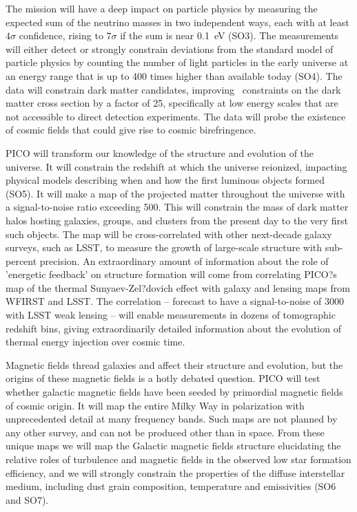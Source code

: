 \documentclass[PICOReport.tex]{subfiles}
\begin{document}
The mission will have a deep impact on particle physics by measuring the expected sum of the neutrino masses in two independent ways, each with at least $4\sigma$ confidence, rising to $7\sigma$ if the sum is near 0.1~eV (SO3). The measurements will either detect or strongly constrain deviations from the standard model of particle physics by counting the number of light particles in the early universe at an energy range that is up to 400 times higher than available today  (SO4). The data will constrain dark matter candidates, improving \planck\ constraints on the dark matter cross section by a factor of 25, specifically at low energy scales that are not accessible to direct detection experiments. The data will probe the existence of cosmic fields that could give rise to cosmic birefringence. 

PICO will transform our knowledge of the structure and evolution of the universe. It will constrain the redshift at which the universe reionized, impacting physical models describing when and how the first luminous objects formed (SO5).  It will make a map of the projected matter throughout the universe with a signal-to-noise ratio exceeding 500. This will constrain the mass of dark matter halos hosting galaxies, groups, and clusters from the present day to the very first such objects.  The map will be cross-correlated with other next-decade galaxy surveys, such as LSST, to measure the growth of large-scale structure with sub-percent precision.  An extraordinary amount of information about the role of 'energetic feedback' on structure formation will come from correlating PICO?s map of the thermal Sunyaev-Zel?dovich effect with galaxy and lensing maps from WFIRST and LSST. The correlation -- forecast to have a signal-to-noise of 3000 with LSST weak lensing -- will enable measurements in dozens of tomographic redshift bins, giving extraordinarily detailed information about the evolution of thermal energy injection over cosmic time.

Magnetic fields thread galaxies and affect their structure and evolution, but the origins of these magnetic fields is a hotly debated question. PICO will test whether galactic magnetic fields have been seeded by primordial magnetic fields of cosmic origin. It will map the entire Milky Way in polarization with unprecedented detail at many frequency bands. Such maps are not planned by any other survey, and can not be produced other than in space.  From these unique maps we will map the Galactic magnetic fields structure elucidating the relative roles of turbulence and magnetic fields in the observed low star formation efficiency, and we will strongly constrain the properties of the diffuse interstellar medium, including dust grain composition, temperature and emissivities (SO6 and SO7).
\end{document}
